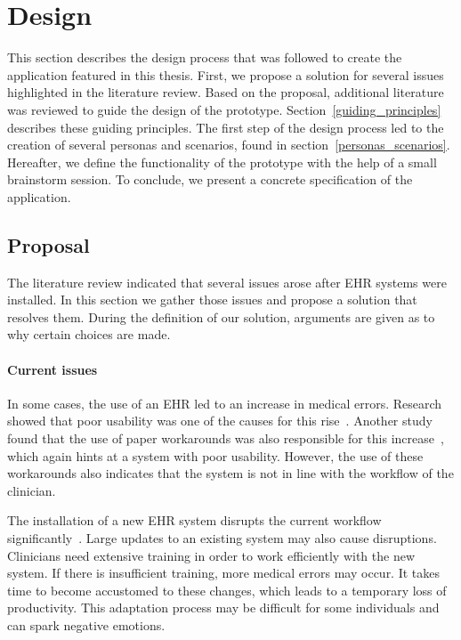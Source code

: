 \section{Design}\label{design}

This section describes the design process that was followed to create the application featured in this thesis. First, we propose a solution for several issues highlighted in the literature review. Based on the proposal, additional literature was reviewed to guide the design of the prototype. Section~\ref{guiding_principles} describes these guiding principles. The first step of the design process led to the creation of several personas and scenarios, found in section~\ref{personas_scenarios}. Hereafter, we define the functionality of the prototype with the help of a small brainstorm session. To conclude, we present a concrete specification of the application.

    \subsection{Proposal}\label{proposal}
    
    The literature review indicated that several issues arose after EHR systems were installed. In this section we gather those issues and propose a solution that resolves them. During the definition of our solution, arguments are given as to why certain choices are made.

    \paragraph{Current issues} In some cases, the use of an EHR led to an increase in medical errors. Research showed that poor usability was one of the causes for this rise~\cite{Koppel2005}. Another study found that the use of paper workarounds was also responsible for this increase~\cite{Saleem2009}, which again hints at a system with poor usability. However, the use of these workarounds also indicates that the system is not in line with the workflow of the clinician.

    The installation of a new EHR system disrupts the current workflow significantly~\cite{Menachemi2011}. Large updates to an existing system may also cause disruptions. Clinicians need extensive training in order to work efficiently with the new system. If there is insufficient training, more medical errors may occur. It takes time to become accustomed to these changes, which leads to a temporary loss of productivity. This adaptation process may be difficult for some individuals and can spark negative emotions.

